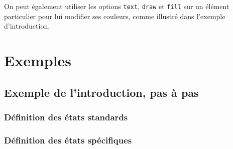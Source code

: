 \documentclass[a4paper,11pt]{report}
\newcommand{\inputTikZ}[1]{%
  }%
\newcommand{\inputTikZ}[1]{%
    \texttt{[image: fig/\#1.pdf]}%
  }%
\begin{document}
On peut également utiliser les options {\tt text}, {\tt draw} et {\tt fill} sur un élément particulier pour lui modifier ses couleurs, comme illustré dans l'exemple d'introduction.

\section{Exemples}

\subsection{Exemple de l'introduction, pas à pas}

\subsubsection{Définition des états standards}

\medskip

\begin{center}
\inputTikZ{statediagstep1}
\end{center}

\newpage

{\color{red!70!black}
\vspace{-0.37cm}
\vspace{-0.37cm}
\vspace{-0.37cm}
\vspace{-0.37cm}
\vspace{-0.37cm}

}

\vspace{-0.5cm}

\subsubsection{Définition des états spécifiques}

\medskip

\begin{center}
\inputTikZ{statediagstep2}
\end{center}

\medskip
\end{document}
